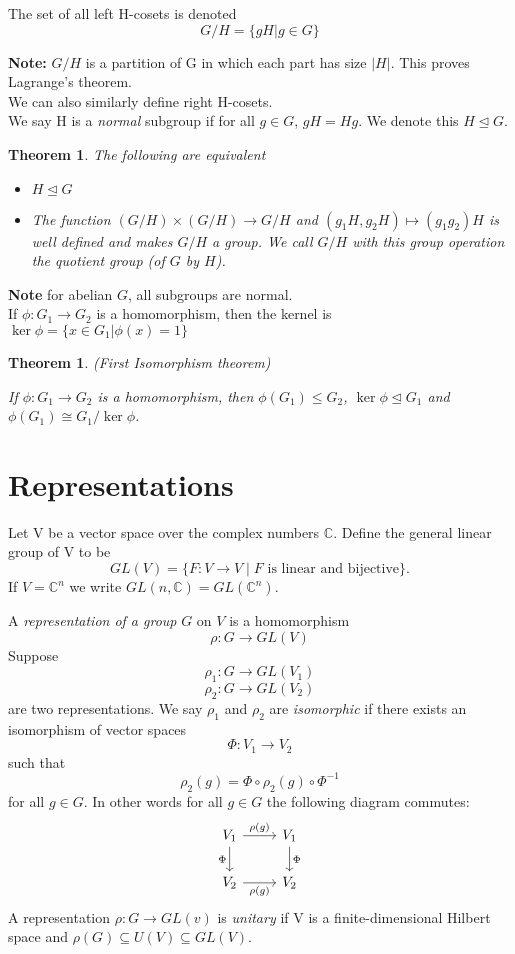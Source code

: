 \documentclass{article}
\newtheorem{thm}{Theorem}
\newtheorem*{theorem}{Theorem}
\begin{document}
The set of all left H-cosets is denoted 
$$G/H = \{gH | g \in G\}$$

\textbf{Note:} $G/H$ is a partition of G in which each part has size $|H|$.  This proves Lagrange's theorem. \\

We can also similarly define right H-cosets. \\

We say H is a \emph{normal} subgroup if for all $g \in G $, $gH=Hg$.  We denote this $H \unlhd G$. \\

\begin{theorem}
The following are equivalent
\begin{itemize}
\item $H \unlhd G$
\item The function $(G/H) \times (G/H) \to G/H$ and $(g_{1}H,g_{2}H) \mapsto (g_{1}g_{2})H$ is well defined and makes $G/H$ a group.  We call $G/H$ with this group operation the quotient group (of $G$ by $H$).
\end{itemize}
\end{theorem}

\textbf{Note} for abelian $G$, all subgroups are normal. \\

If $\phi : G_{1} \to G_{2}$ is a homomorphism, then the kernel is $\ker \phi = \{x\in G_{1}  | \phi(x)=1\}$


\begin{thm}{(First Isomorphism theorem)}

If $\phi : G_{1} \to G_{2}$ is a homomorphism, then $\phi(G_{1}) \leq G_{2}$, $\ker \phi \unlhd G_{1}$ and $\phi(G_1) \cong G_{1}/\ker \phi$.  
   
\end{thm}

\section{Representations}
Let V be a vector space over the complex numbers $\mathbb{C}$. Define the general linear group of V to be
\[ GL(V) = \{F: V\to V \mid F \text{ is linear and bijective}\}.\]
If $V = \mathbb{C}^{n}$ we write $GL(n,\mathbb{C}) = GL(\mathbb{C}^{n})$.

A \emph{representation of a group} $G$ on $V$ is a homomorphism 
$$\rho : G \to GL(V)$$
Suppose 
$$\rho_{1} : G \to GL(V_{1})$$
$$\rho_{2} : G \to GL(V_{2})$$
are two representations. We say $\rho_{1}$ and $\rho_{2}$ are \emph{isomorphic} if there exists an isomorphism of vector spaces
$$\Phi : V_{1} \to V_{2}$$
such that
$$\rho_{2}(g) = \Phi \circ \rho_{2}(g) \circ \Phi^{-1}$$
for all $g \in G$. In other words for all $g \in G$ the following diagram commutes:
\[
\begin{tikzcd}
V_{1} \arrow[r, "\rho(g)"] \arrow[d, "\Phi"'] & V_{1} \arrow[d, "\Phi"] \\
V_{2} \arrow[r, "\rho(g)"']                   & V_{2}                  
\end{tikzcd}
\]
A representation $\rho: G \to GL(v)$ is \emph{unitary} if V is a finite-dimensional Hilbert space and $\rho(G) \subseteq U(V) \subseteq GL(V)$. \\
\end{document}
